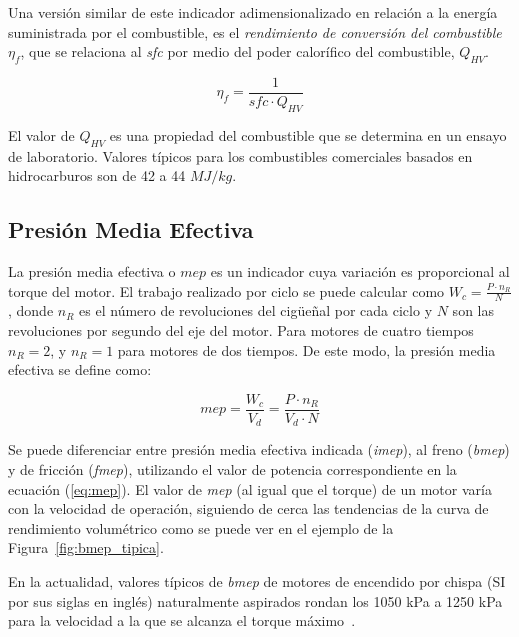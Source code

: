 Una versión similar de este indicador adimensionalizado en relación a la energía
suministrada por el combustible, es el \emph{rendimiento de conversión del
combustible} $\eta_f$, que se relaciona al \emph{sfc} por medio del poder
calorífico del combustible, $Q_{HV}$.


\begin{equation}\label{eq:eta_f} \eta_f = \frac{1}{sfc \cdot Q_{HV}}
\end{equation}

El valor de $Q_{HV}$ es una propiedad del combustible que se determina en un
ensayo de laboratorio.
%
Valores típicos para los combustibles comerciales basados en hidrocarburos son
de 42 a 44 $MJ/kg$.


\subsection{Presión Media Efectiva}
%
La presión media efectiva o $mep$ es un indicador cuya variación es proporcional
al torque del motor.
%
El trabajo realizado por ciclo se puede calcular como
$W_c = \frac{P \cdot n_R}{N}$, donde $n_R$ es el número de revoluciones del
cigüeñal por cada ciclo y $N$ son las revoluciones por segundo del eje del motor.
%
Para motores de cuatro tiempos $n_R=2$, y $n_R=1$ para motores de dos tiempos.
%
De este modo, la presión media efectiva se define como:

\begin{equation}\label{eq:mep}
  mep = \frac{W_{c}}{V_d} = \frac{P \cdot n_R}{V_d \cdot N}
\end{equation}
%

Se puede diferenciar entre presión media efectiva indicada (\emph{imep}), al
freno (\emph{bmep}) y de fricción (\emph{fmep}), utilizando el valor de potencia
correspondiente en la ecuación (\ref{eq:mep}).
%
El valor de \emph{mep} (al igual que el torque) de un motor varía con la
velocidad de operación, siguiendo de cerca las tendencias de la curva de
rendimiento volumétrico como se puede ver en el ejemplo de la
Figura~\ref{fig:bmep_tipica}.

En la actualidad, valores típicos de \emph{bmep} de motores de encendido por
chispa (SI por sus siglas en inglés) naturalmente aspirados rondan los 1050 kPa
a 1250 kPa para la velocidad a la que se alcanza el torque máximo~\parencite{heywood}.

